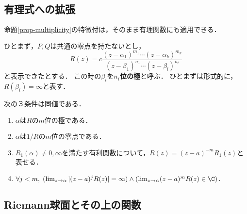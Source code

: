 \documentclass[uplatex, dvipdfmx]{jsreport}
\begin{document}
\subsection{有理式への拡張}

命題\ref{prop-multiplicity}の特徴付は，そのまま有理関数にも適用できる．

\begin{proposition}[pole]
    ひとまず，$P,Q$は共通の零点を持たないとし，
    \[ R(z)=c\frac{(z-\alpha_1)^{m_1}\cdots(z-\alpha_k)^{m_k}}{(z-\beta_1)^{n_1}\cdots(z-\beta_l)^{n_l}} \]
    と表示できたとする．
    この時の$\beta_i$を\textbf{$n_i$位の極}と呼ぶ．
    ひとまずは形式的に，$R(\beta_i)=\infty$と表す．
\end{proposition}

\begin{proposition}
    次の３条件は同値である．
    \begin{enumerate}
        \item $\alpha$は$R$の$m$位の極である．
        \item $\alpha$は$1/R$の$m$位の零点である．
        \item $R_1(\alpha)\ne 0,\infty$を満たす有利関数について，$R(z)=(z-a)^{-m}R_1(z)$と表せる．
        \item $\forall j<m,\; (\lim_{z\to\alpha}|(z-a)^jR(z)|=\infty)\land(\lim_{z\to\alpha}(z-a)^mR(z)\in\C)$．
    \end{enumerate}
\end{proposition}

\subsection{Riemann球面とその上の関数}
\end{document}
